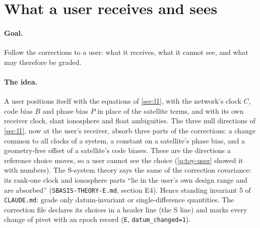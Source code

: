 
\section{What a user receives and sees}\label{sec:l5}

\paragraph{Goal.} Follow the corrections to a user: what it receives, what it
cannot see, and what may therefore be graded.

\paragraph{The idea.} A user positions itself with the equations of
\cref{sec:l1}, with the network's clock $C$, code bias $B$ and phase bias $P$ in
place of the satellite terms, and with its own receiver clock, slant ionosphere
and float ambiguities. The three null directions of \cref{sec:l1}, now at the
user's receiver, absorb three parts of the corrections: a change common to all
clocks of a system, a constant on a satellite's phase bias, and a geometry-free
offset of a satellite's code biases. These are the directions a reference choice
moves, so a user cannot see the choice (\cref{q:toy-user} showed it with numbers).
The S-system theory says the same of the correction covariance: its rank-one
clock and ionosphere parts ``lie in the user's own design range and are absorbed''
(\texttt{SBASIS-THEORY-E.md}, section E4). Hence standing invariant 5 of
\texttt{CLAUDE.md}: grade only datum-invariant or single-difference quantities.
The correction file declares its choices in a header line (the S line) and marks
every change of pivot with an epoch record (\texttt{E}, \texttt{datum\_changed=1}).

